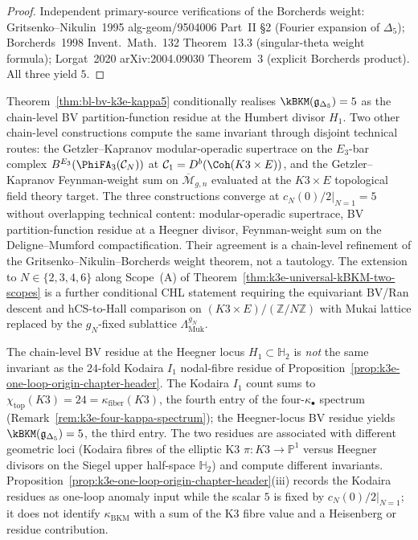 \begin{proof}
Independent primary-source verifications of the Borcherds weight: Gritsenko--Nikulin~1995 alg-geom/9504006 Part~II \S2 (Fourier expansion of $\Delta_5$); Borcherds~1998 Invent.~Math.~132 Theorem~13.3 (singular-theta weight formula); Lorgat~2020 arXiv:2004.09030 Theorem~3 (explicit Borcherds product). All three yield $5$.
\end{proof}

\begin{remark}[Three chain-level constructions of $\kBKM(\mathfrak{g}_{\Delta_5}) = 5$]
\label{rem:bl-bv-k3e-path2}
Theorem~\ref{thm:bl-bv-k3e-kappa5} conditionally realises $\kBKM(\mathfrak{g}_{\Delta_5}) = 5$ as the chain-level BV partition-function residue at the Humbert divisor $H_1$. Two other chain-level constructions compute the same invariant through disjoint technical routes: the Getzler--Kapranov modular-operadic supertrace on the $E_3$-bar complex $B^{E_3}(\PhiFA_3(\mathcal{C}_N))$ at $\mathcal{C}_1 = D^b(\Coh(K3 \times E))$, and the Getzler--Kapranov Feynman-weight sum on $\overline{\mathcal{M}}_{g, n}$ evaluated at the $K3 \times E$ topological field theory target. The three constructions converge at $\left.c_N(0)/2\right|_{N=1} = 5$ without overlapping technical content: modular-operadic supertrace, BV partition-function residue at a Heegner divisor, Feynman-weight sum on the Deligne--Mumford compactification. Their agreement is a chain-level refinement of the Gritsenko--Nikulin--Borcherds weight theorem, not a tautology. The extension to $N \in \{2, 3, 4, 6\}$ along Scope~(A) of Theorem~\ref{thm:k3e-universal-kBKM-two-scopes} is a further conditional CHL statement requiring the equivariant BV/Ran descent and hCS-to-Hall comparison on $(K3 \times E)/(\mathbb{Z}/N\mathbb{Z})$ with Mukai lattice replaced by the $g_N$-fixed sublattice $\Lambda^{g_N}_{\mathrm{Muk}}$.
\end{remark}

\begin{remark}
\label{rem:bl-heegner-vs-kodaira-residues}
The chain-level BV residue at the Heegner locus $H_1 \subset \mathbb{H}_2$ is \emph{not} the same invariant as the $24$-fold Kodaira $I_1$ nodal-fibre residue of Proposition~\ref{prop:k3e-one-loop-origin-chapter-header}. The Kodaira $I_1$ count sums to $\chi_{\mathrm{top}}(K3) = 24 = \kappa_{\mathrm{fiber}}(K3)$, the fourth entry of the four-$\kappa_\bullet$ spectrum (Remark~\ref{rem:k3e-four-kappa-spectrum}); the Heegner-locus BV residue yields $\kBKM(\mathfrak{g}_{\Delta_5}) = 5$, the third entry. The two residues are associated with different geometric loci (Kodaira fibres of the elliptic K3 $\pi \colon K3 \to \mathbb{P}^1$ versus Heegner divisors on the Siegel upper half-space $\mathbb{H}_2$) and compute different invariants. Proposition~\ref{prop:k3e-one-loop-origin-chapter-header}(iii) records the Kodaira residues as one-loop anomaly input while the scalar $5$ is fixed by $\left.c_N(0)/2\right|_{N=1}$; it does not identify $\kappa_{\mathrm{BKM}}$ with a sum of the K3 fibre value and a Heisenberg or residue contribution.
\end{remark}

